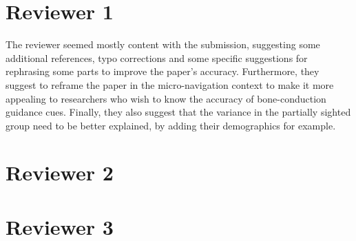 \documentclass{article}
\begin{document}
\section{Reviewer 1}

The reviewer seemed mostly content with the submission, suggesting some additional references, typo corrections and some specific suggestions for rephrasing some parts to improve the paper's accuracy. 
Furthermore, they suggest to reframe the paper in the micro-navigation context to make it more appealing to researchers who wish to know the accuracy of bone-conduction guidance cues.
Finally, they also suggest that the variance in the partially sighted group need to be better explained, by adding their demographics for example. 

\section{Reviewer 2}

\section{Reviewer 3}
\end{document}
